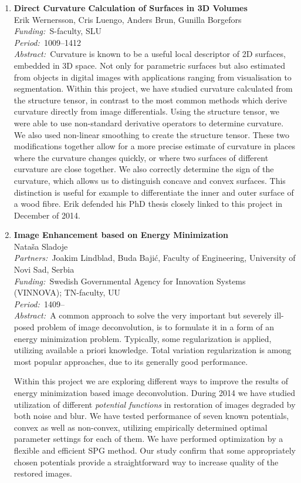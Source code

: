 \documentclass[10pt, a4paper]{article}
\newcommand{\aabstract}[1]{\emph{Abstract:~}#1}
\newcommand{\ffunding}[1]{\emph{Funding:~}#1\\}
\newcommand{\ppartners}[1]{\emph{Partners:~}#1\\}
\newcommand{\pperiod}[1]{\emph{Period:~}#1\\}
\begin{document}
{\begin{enumerate}
\item
\textbf{Direct Curvature Calculation of Surfaces in 3D Volumes }\\
Erik Wernersson, Cris Luengo, Anders Brun, Gunilla Borgefors \\
\ffunding{S-faculty, SLU}
\pperiod{1009--1412}
\aabstract{Curvature is known to be a useful local descriptor of 2D surfaces, embedded in 3D space. Not only for parametric surfaces but also estimated from objects in digital images with applications ranging from visualisation to segmentation. Within this project, we have studied curvature calculated from the structure tensor, in contrast to the most common methods which derive curvature directly from image differentials. Using the structure tensor, we were able to use non-standard derivative operators to determine curvature. We also used non-linear smoothing to create the structure tensor. These two modifications together allow for a more precise estimate of curvature in places where the curvature changes quickly, or where two surfaces of different curvature are close together. We also correctly determine the sign of the curvature, which allows us to distinguish concave and convex surfaces. This distinction is useful for example to differentiate the inner and outer surface of a wood fibre. Erik defended his PhD thesis closely linked to this project in December of 2014.}


\item
\textbf{Image Enhancement based on Energy Minimization}\\
Nata\v sa Sladoje\\
\ppartners{Joakim Lindblad, Buda Baji\' c, Faculty of Engineering, University of Novi Sad, Serbia}
\ffunding{Swedish Governmental Agency for Innovation Systems (VINNOVA); TN-faculty, UU}
\pperiod{1409--}
\aabstract{A common approach  to solve the very important but severely ill-posed problem of image deconvolution, is to formulate it in a form of an energy minimization problem. Typically, some regularization is applied, utilizing available a priori knowledge. Total variation regularization is among most popular approaches, due to its generally good performance. 

Within this project we are exploring different ways to improve the results of energy minimization based image deconvolution. During 2014 we have studied utilization of different {\em potential functions} in restoration of images degraded by both noise and blur. We have tested performance of seven known potentials, convex as well as non-convex, utilizing empirically determined optimal parameter settings for each of them. We have performed optimization  by a  flexible and efficient SPG method. Our study confirm that some appropriately chosen potentials provide a straightforward way to increase quality of the restored images. 

}
\end{enumerate}}
\end{document}
